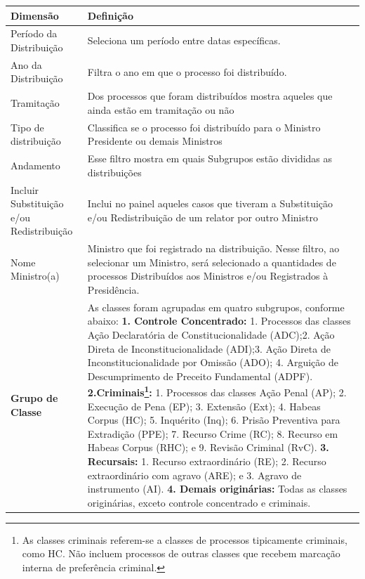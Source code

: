 \documentclass[
]{book}
\begin{document}
\begin{longtable}[]{@{}
  >{\raggedright\arraybackslash}p{}
  >{\raggedright\arraybackslash}p{}@{}}
\toprule
Dimensão & Definição \\
\midrule
\endhead
Período da Distribuição & Seleciona um período entre datas específicas. \\
Ano da Distribuição & Filtra o ano em que o processo foi distribuído. \\
Tramitação & Dos processos que foram distribuídos mostra aqueles que ainda estão em tramitação ou não \\
Tipo de distribuição & Classifica se o processo foi distribuído para o Ministro Presidente ou demais Ministros \\
Andamento & Esse filtro mostra em quais Subgrupos estão divididas as distribuições \\
Incluir Substituição e/ou Redistribuição & Inclui no painel aqueles casos que tiveram a Substituição e/ou Redistribuição de um relator por outro Ministro \\
Nome Ministro(a) & Ministro que foi registrado na distribuição. Nesse filtro, ao selecionar um Ministro, será selecionado a quantidades de processos Distribuídos aos Ministros e/ou Registrados à Presidência. \\
\textbf{Grupo de Classe} & As classes foram agrupadas em quatro subgrupos, conforme abaixo: \textbf{1. Controle Concentrado:} 1. Processos das classes Ação Declaratória de Constitucionalidade (ADC);2. Ação Direta de Inconstitucionalidade (ADI);3. Ação Direta de Inconstitucionalidade por Omissão (ADO); 4. Arguição de Descumprimento de Preceito Fundamental (ADPF). \textbf{2.Criminais\footnote{As classes criminais referem-se a classes de processos tipicamente criminais, como HC. Não incluem processos de outras classes que recebem marcação interna de preferência criminal.}:} 1. Processos das classes Ação Penal (AP); 2. Execução de Pena (EP); 3. Extensão (Ext); 4. Habeas Corpus (HC); 5. Inquérito (Inq); 6. Prisão Preventiva para Extradição (PPE); 7. Recurso Crime (RC); 8. Recurso em Habeas Corpus (RHC); e 9. Revisão Criminal (RvC). \textbf{3. Recursais:} 1. Recurso extraordinário (RE); 2. Recurso extraordinário com agravo (ARE); e 3. Agravo de instrumento (AI). \textbf{4. Demais originárias:} Todas as classes originárias, exceto controle concentrado e criminais. \\
\bottomrule
\end{longtable}
\end{document}
